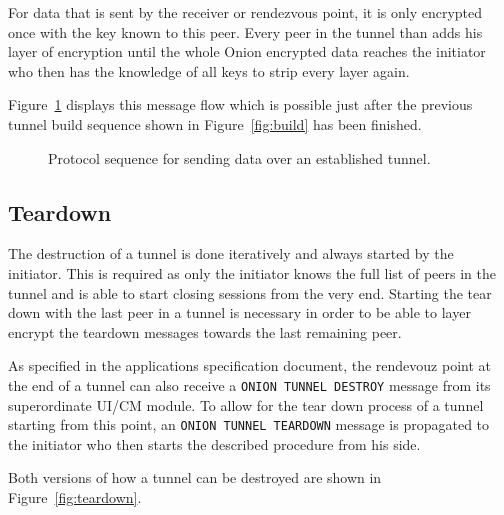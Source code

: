 \documentclass[paper=letter, fontsize=12pt]{article}
\begin{document}
For data that is sent by the receiver or rendezvous point, it is only encrypted once with the key known to this peer. Every peer in the tunnel than adds his layer of encryption until the whole Onion encrypted data reaches the initiator who then has the knowledge of all keys to strip every layer again.

Figure~\ref{fig:data} displays this message flow which is possible just after the previous tunnel build sequence shown in Figure~\ref{fig:build} has been finished.

\begin{figure}[ht]
    \caption{Protocol sequence for sending data over an established tunnel.}
    \label{fig:data}
\end{figure}

\subsection{Teardown}
\label{sec:function:teardown}
The destruction of a tunnel is done iteratively and always started by the initiator. This is required as only the initiator knows the full list of peers in the tunnel and is able to start closing sessions from the very end. Starting the tear down with the last peer in a tunnel is necessary in order to be able to layer encrypt the teardown messages towards the last remaining peer. 

As specified in the applications specification document, the rendevouz point at the end of a tunnel can also receive a \texttt{ONION TUNNEL DESTROY} message from its superordinate UI/CM module. To allow for the tear down process of a tunnel starting from this point, an \texttt{ONION TUNNEL TEARDOWN} message is propagated to the initiator who then starts the described procedure from his side.

Both versions of how a tunnel can be destroyed are shown in Figure~\ref{fig:teardown}.
\end{document}
